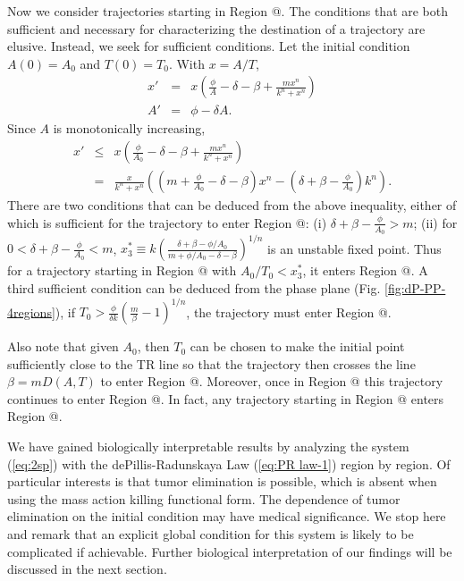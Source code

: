 \documentclass[review,authoryear]{elsarticle}
\makeatletter
\newcommand*{\rom}[1]{\expandafter\@slowromancap\romannumeral #1@}
\makeatother
\begin{document}
Now we consider trajectories starting in Region \rom{3}.  The conditions that are both sufficient and necessary for characterizing the destination of a trajectory are elusive.
Instead, we seek for sufficient conditions. Let the initial condition $A(0)=A_0$ and $T(0)=T_0$.
With $x=A/T$, 
\begin{eqnarray*}
x' & = & x(\frac{\phi}{A}-\delta-\beta+\frac{mx^{n}}{k^{n}+x^{n}})\\
A' & = & \phi-\delta A.
\end{eqnarray*}
Since $A$ is monotonically increasing,
\begin{eqnarray*}
x' & \le & x(\frac{\phi}{A_{0}}-\delta-\beta+\frac{mx^{n}}{k^{n}+x^{n}})\\
   & = & \frac{x}{k^{n}+x^{n}}((m+\frac{\phi}{A_{0}}-\delta-\beta)x^{n}-(\delta+\beta-\frac{\phi}{A_{0}})k^{n}).
\end{eqnarray*}
There are two conditions that can be deduced from the above inequality, either of which is sufficient for the trajectory
to enter Region \rom{2}: (i) $\delta+\beta-\frac{\phi}{A_{0}}>m$; (ii) for $0<\delta+\beta-\frac{\phi}{A_{0}}<m$,
$x_{3}^{*} \equiv k(\frac{\delta+\beta-\phi/A_{0}}{m+\phi/A_{0}-\delta-\beta})^{1/n}$ is an unstable fixed point. Thus for a trajectory starting in Region \rom{3} with $A_0/T_0<x_{3}^{*}$,
it enters Region \rom{2}. A third sufficient condition can be deduced from the phase plane (Fig. \ref{fig:dP-PP-4regions}), if $T_0>\frac{\phi}{\delta k}(\frac{m}{\beta}-1)^{1/n}$, the trajectory must enter Region \rom{2}. 

Also note that given $A_0$, then $T_0$ can be chosen to make the initial point sufficiently close to the TR line so that the trajectory then crosses the line $\beta=mD(A,T)$
to enter Region \rom{4}. Moreover, once in Region \rom{4} this trajectory continues to enter Region \rom{1}. In fact, any trajectory starting in Region \rom{4} enters Region \rom{1}. 

We have gained biologically interpretable results by analyzing the system (\ref{eq:2sp}) with the dePillis-Radunskaya Law (\ref{eq:PR law-1}) region by region.  Of particular interests is that tumor elimination is possible, which is absent when using the mass action killing functional form. The dependence of tumor elimination on the initial condition may have medical significance. We stop here and remark that an explicit global condition for this system is likely to be complicated if achievable. Further biological interpretation of our findings will be discussed in the next section.
\end{document}
